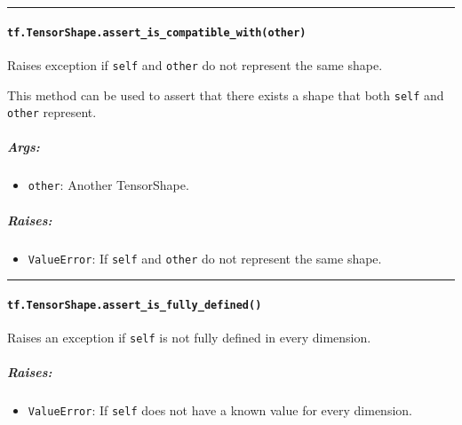 \begin{center}\rule{0.5\linewidth}{\linethickness}\end{center}

\paragraph{\texorpdfstring{\lstinline{tf.TensorShape.assert_is_compatible_with(other)}
}{tf.TensorShape.assert_is_compatible_with(other) }}\label{tf.tensorshape.assertux5fisux5fcompatibleux5fwithother}

Raises exception if \lstinline{self} and \lstinline{other} do not represent
the same shape.

This method can be used to assert that there exists a shape that both
\lstinline{self} and \lstinline{other} represent.

\subparagraph{Args: }\label{args-38}

\begin{itemize}
\tightlist
\item
  \lstinline{other}: Another TensorShape.
\end{itemize}

\subparagraph{Raises: }\label{raises-23}

\begin{itemize}
\tightlist
\item
  \lstinline{ValueError}: If \lstinline{self} and \lstinline{other} do not
  represent the same shape.
\end{itemize}

\begin{center}\rule{0.5\linewidth}{\linethickness}\end{center}

\paragraph{\texorpdfstring{\lstinline{tf.TensorShape.assert_is_fully_defined()}
}{tf.TensorShape.assert_is_fully_defined() }}\label{tf.tensorshape.assertux5fisux5ffullyux5fdefined}

Raises an exception if \lstinline{self} is not fully defined in every
dimension.

\subparagraph{Raises: }\label{raises-24}

\begin{itemize}
\tightlist
\item
  \lstinline{ValueError}: If \lstinline{self} does not have a known value for
  every dimension.
\end{itemize}

